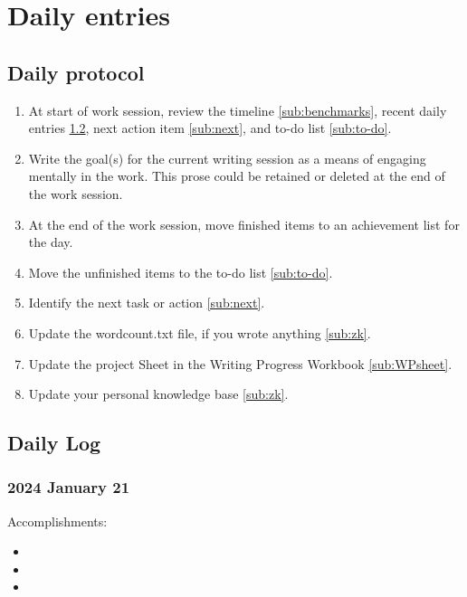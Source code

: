 \documentclass[10pt,letterpaper]{article}
\newcommand{\bi}{\begin{itemize}}
\newcommand{\ei}{\end{itemize}}
\newcommand{\be}{\begin{enumerate}}
\newcommand{\ee}{\end{enumerate}}
\begin{document}
\section{Daily entries}
\label{sec:dailyEntries}

\subsection{Daily protocol}
\label{sub:entry-protocol}

\be
\item At start of work session, review the timeline \ref{sub:benchmarks}, recent daily entries \ref{sub:daily-log}, next action item \ref{sub:next}, and to-do list \ref{sub:to-do}.
\item Write the goal(s) for the current writing session as a means of engaging mentally in the work. This prose could be retained or deleted at the end of the work session.
\item At the end of the work session, move finished items to an achievement list for the day.
\item Move the unfinished items to the to-do list \ref{sub:to-do}.
\item Identify the next task or action \ref{sub:next}.
\item Update the wordcount.txt file, if you wrote anything \ref{sub:zk}.
\item Update the project Sheet in the Writing Progress Workbook \ref{sub:WPsheet}.
\item Update your personal knowledge base \ref{sub:zk}.
\ee


\subsection{Daily Log}
\label{sub:daily-log}


\subsubsection{2024 January 21}

Accomplishments:
\bi
\item 
\item
\item
\ei
\end{document}
